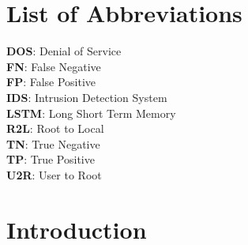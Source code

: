 {
\KECadjusttocspacings %
\makeatletter
\def\@makeschapterhead#1{%
  {\newpage \parindent \z@ \raggedright
    \normalfont
    \interlinepenalty\@M
    \center \fontsize{16pt}{1} \bfseries \MakeUppercase{#1}\par\nobreak
  }}
\makeatother 

\tableofcontents %
\listoffigures %
}
\chapter*{List of Abbreviations}
\textbf{DOS}: Denial of Service\\
\textbf{FN}: False  Negative \\
\textbf{FP}: False Positive\\
\textbf{IDS}: Intrusion Detection System\\
\textbf{LSTM}: Long Short Term Memory\\
\textbf{R2L}: Root to Local \\
\textbf{TN}: True Negative\\
\textbf{TP}: True Positive\\
\textbf{U2R}: User to Root\\


\newpage
{} %

\chapter{Introduction}
\vspace{-18pt}
